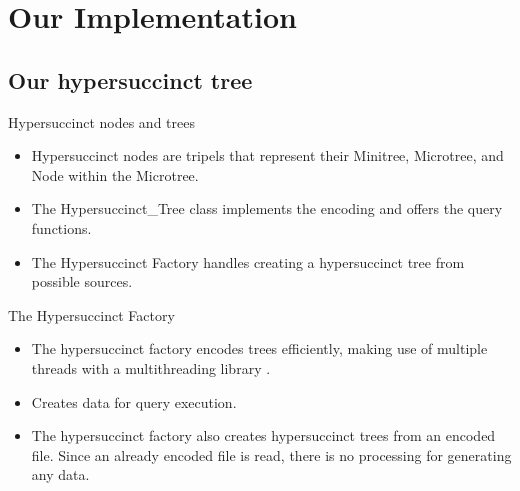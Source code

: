 \documentclass{beamer}
\begin{document}
\section{Our Implementation}

\subsection{Our hypersuccinct tree}

\begin{frame}{Hypersuccinct nodes and trees}
	\begin{itemize}
	\item
		Hypersuccinct nodes are tripels that represent their Minitree, Microtree, and Node within the Microtree.
	\item
		The Hypersuccinct\_Tree class implements the encoding and offers the query functions.
	\item
		The Hypersuccinct Factory handles creating a hypersuccinct tree from possible sources.
	\end{itemize}
\end{frame}

\begin{frame}{The Hypersuccinct Factory}
	\begin{itemize}
	\item
		The hypersuccinct factory encodes trees efficiently, making use of multiple threads with a multithreading library \cite{threading}.
	\item
		Creates data for query execution.
	\item
		The hypersuccinct factory also creates hypersuccinct trees from an encoded file. Since an already encoded file is read, there is no processing for generating any data.
	\end{itemize}
\end{frame}
\end{document}
